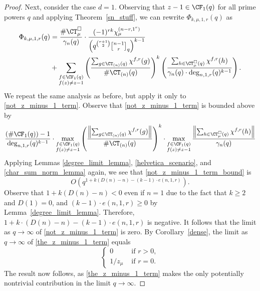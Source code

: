 \begin{proof}
Next, consider the case \(d = 1\).
Observing that \(z-1 \in \CF_1 (q)\) for all prime powers \(q\) and applying Theorem~\ref{sn_stuff}, we can rewrite \(\Phi_{k,\mu,1,r} (q)\) as
\begin{align}
\Phi_{k,\mu,1,r} (q)
& =
\frac{\# \CT_\mu^\Box}{\gamma_n (q)}
\cdot
\frac{(-1)^{rk} \chi^{(n-r,1^r)}_\mu}{\left ( q^{\binom{r+1}{2}} {\genfrac[]{0pt}{1}{n - 1}{r}}_{q} \right )^{k-1}}
\label{the_z_minus_1_term}
\\
& + \label{not_z_minus_1_term}
\sum_{\substack{f \in \CF_1 (q) \\ f(z) \neq z-1}}
\left (
\frac{\sum_{g \in \CT_{(n)}(q)} \chi^{f,r}(g)}{\# \CT_{(n)}(q)}
\right )^k
\left (
\frac{\sum_{h \in \CT^\Box_\mu(q)} \chi^{f,r}(h)}{\gamma_n(q) \cdot \deg_{n,1,r}(q)^{k-1}}
\right ).
\end{align}
We repeat the same analysis as before, but apply it only to \eqref{not_z_minus_1_term}.
Observe that \eqref{not_z_minus_1_term} is bounded above by
\begin{equation}
\label{not_z_minus_1_term_bound}
\frac{
(\# \CF_1(q)) - 1
}{
\deg_{n,1,r} (q)^{k-1}
}
\cdot
\max_{\substack{f \in \CF_1 (q) \\ f(z) \neq z-1}}
\left (
\frac{\left \| \sum_{g \in \CT_{(n)}(q)} \chi^{f,r}(g) \right \|}{\# \CT_{(n)}(q)}
\right )^k
\cdot
\max_{\substack{f \in \CF_1 (q) \\ f(z) \neq z-1}}
\frac{\left \| \sum_{h \in \CT^\Box_\mu(q)} \chi^{f,r}(h) \right \|}{\gamma_n(q)}
\end{equation}
Applying Lemmas \ref{degree_limit_lemma}, \ref{helvetica_scenario}, and \ref{char_sum_norm_lemma} again, we see that \eqref{not_z_minus_1_term_bound} is
\begin{equation}
\label{d_1_non_z_minus_1}
O \left (
q^{1 + k (D(n) - n) - (k-1) \cdot e(n,1,r)}
\right ).
\end{equation}
Observe that \(1 + k(D(n) - n) < 0\) even if \(n = 1\) due to the fact that \(k \geq 2\) and \(D(1)=0\), and \((k-1) \cdot e(n,1,r) \geq 0\) by Lemma~\ref{degree_limit_lemma}.
Therefore, \(1 + k \cdot (D(n) - n) - (k-1) \cdot e(n,1,r)\) is negative.
It follows that the limit as \(q \to \infty\) of \eqref{not_z_minus_1_term} is zero.
By Corollary~\ref{dense}, the limit as \(q \to \infty\) of \eqref{the_z_minus_1_term} equals
\begin{equation}
\begin{cases}
0 & \text{ if } r > 0, \\
1/z_\mu & \text{ if } r = 0.
\end{cases}
\end{equation}
The result now follows, as \eqref{the_z_minus_1_term} makes the only potentially nontrivial contribution in the limit \(q \to \infty\).
\end{proof}











